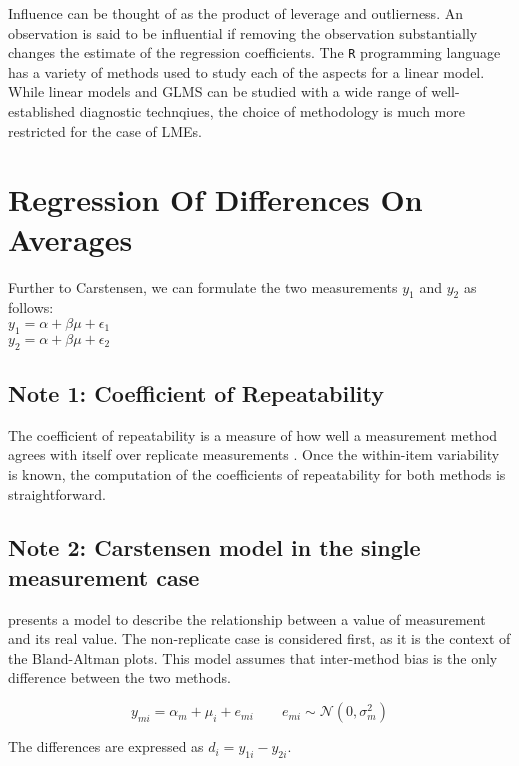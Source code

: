 \documentclass[12pt, a4paper]{report}
\theoremstyle{plain}
\theoremstyle{definition}
\theoremstyle{remark}
\begin{document}
Influence can be thought of as the product of leverage and outlierness. An observation is said to be influential if removing the observation substantially changes the estimate of the regression coefficients. The \texttt{R} programming language has a variety of methods used to study each of the aspects for a linear model. While linear models and GLMS can be studied with a wide range of well-established diagnostic technqiues, the choice of methodology is much more restricted for the case of LMEs.



\section{Regression Of Differences On Averages}
Further to Carstensen, we can formulate the two measurements
$y_{1}$ and $y_{2}$ as follows:
\\
$y_{1} = \alpha + \beta\mu + \epsilon_{1}$
\\
$y_{2} = \alpha + \beta\mu + \epsilon_{2}$








\subsection{Note 1: Coefficient of Repeatability}
The coefficient of repeatability is a measure of how well a
measurement method agrees with itself over replicate measurements
\citep{BA99}. Once the within-item variability is known, the
computation of the coefficients of repeatability for both methods
is straightforward.



\subsection{Note 2: Carstensen model in the single measurement case}
\citet{BXC2004} presents a model to describe the relationship between a value of measurement and its real value.
The non-replicate case is considered first, as it is the context of the Bland-Altman plots.
This model assumes that inter-method bias is the only difference between the two methods.


\begin{equation}
y_{mi}  = \alpha_{m} + \mu_{i} + e_{mi} \qquad  e_{mi} \sim \mathcal{N}(0,\sigma^{2}_{m})
\end{equation}

The differences are expressed as $d_{i} = y_{1i} - y_{2i}$.
\end{document}
